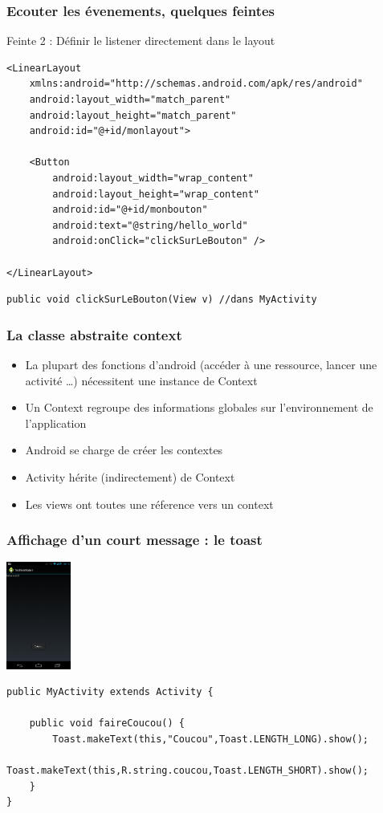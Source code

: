 \documentclass{beamer}
\begin{document}
\begin{frame}[fragile]
\frametitle{Ecouter les évenements, quelques feintes}
Feinte 2 : Définir le listener directement dans le layout
\begin{lstlisting}
<LinearLayout 
	xmlns:android="http://schemas.android.com/apk/res/android"
    android:layout_width="match_parent"
    android:layout_height="match_parent"
    android:id="@+id/monlayout">

    <Button
        android:layout_width="wrap_content"
        android:layout_height="wrap_content"
        android:id="@+id/monbouton"
        android:text="@string/hello_world"
        android:onClick="clickSurLeBouton" />

</LinearLayout>
\end{lstlisting}
\begin{lstlisting}
public void clickSurLeBouton(View v) //dans MyActivity
\end{lstlisting}
\end{frame}

\begin{frame}[fragile]
\frametitle{La classe abstraite context}
\begin{itemize}
 \item La plupart des fonctions d'android (accéder à une ressource,
 lancer une activité \ldots) nécessitent une instance de Context
 \item Un Context regroupe des informations globales sur l'environnement de
 l'application
 \item Android se charge de créer les contextes
 \item Activity hérite (indirectement) de Context
 \item Les views ont toutes une réference vers un context
 \end{itemize}
\end{frame}

\begin{frame}[fragile]
\frametitle{Affichage d'un court message : le toast}
\includegraphics[width=60pt]{img/coucou.png}
\begin{lstlisting}
public MyActivity extends Activity {
    
    public void faireCoucou() {
        Toast.makeText(this,"Coucou",Toast.LENGTH_LONG).show();
        Toast.makeText(this,R.string.coucou,Toast.LENGTH_SHORT).show();
    }	
}
\end{lstlisting}
\end{frame}
\end{document}
